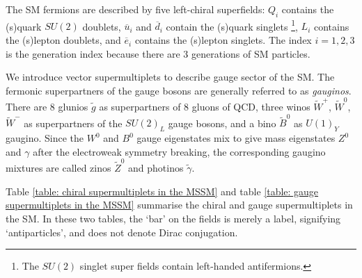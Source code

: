 \documentclass[12pt]{report}
\begin{document}
The SM fermions are described by five left-chiral superfields: $Q_{i}$ contains the (s)quark $SU(2)$ doublets, $\overline{u}_{i}$  and $\overline{d}_{i}$ contain the (s)quark singlets \footnote{The $SU(2)$ singlet super fields contain left-handed antifermions.}, $L_{i}$ contains the (s)lepton doublets, and $\overline{e}_{i}$ contains the (s)lepton singlets.
The index $i = 1, 2, 3$ is the generation index because there are 3 generations of SM particles.

We introduce vector supermultiplets to describe gauge sector of the SM.
The fermonic superpartners of the gauge bosons are generally referred to as \textit{gauginos}.
There are 8 glunios $\widetilde{g}$ as superpartners of 8 gluons of QCD, three winos $\widetilde{W}^{+}$, $\widetilde{W}^{0}$, $\widetilde{W}^{-}$ as superpartners of the $SU(2)_{L}$ gauge bosons, and a bino $\widetilde{B}^{0}$ as $U(1)_{Y}$ gaugino.
Since the $W^{0}$ and $B^{0}$ gauge eigenstates mix to give mass eigenstates $Z^{0}$ and $\gamma$ after the electroweak symmetry breaking, the corresponding gaugino mixtures are called zinos $\widetilde{Z}^{0}$ and photinos $\widetilde{\gamma}$.

Table \ref{table: chiral supermultiplets in the MSSM} and table \ref{table: gauge supermultiplets in the MSSM} summarise the chiral and gauge supermultiplets in the SM.
In these two tables, the `bar' on the fields is merely a label, signifying `antiparticles', and does not denote Dirac conjugation.
\end{document}
